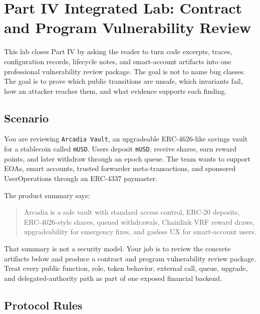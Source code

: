 \chapter*{Part IV Integrated Lab: Contract and Program Vulnerability Review}
{}

\begin{labbox}
This lab closes Part IV by asking the reader to turn code excerpts, traces, configuration records, lifecycle notes, and smart-account artifacts into one professional vulnerability review package. The goal is not to name bug classes. The goal is to prove which public transitions are unsafe, which invariants fail, how an attacker reaches them, and what evidence supports each finding.
\end{labbox}

\section*{Scenario}

You are reviewing \texttt{Arcadia Vault}, an upgradeable ERC-4626-like savings vault for a stablecoin called \texttt{mUSD}. Users deposit \texttt{mUSD}, receive shares, earn reward points, and later withdraw through an epoch queue. The team wants to support EOAs, smart accounts, trusted forwarder meta-transactions, and sponsored UserOperations through an ERC-4337 paymaster.

The product summary says:

\begin{quote}
Arcadia is a safe vault with standard access control, ERC-20 deposits, ERC-4626-style shares, queued withdrawals, Chainlink VRF reward draws, upgradeability for emergency fixes, and gasless UX for smart-account users.
\end{quote}

That summary is not a security model. Your job is to review the concrete artifacts below and produce a contract and program vulnerability review package. Treat every public function, role, token behavior, external call, queue, upgrade, and delegated-authority path as part of one exposed financial backend.

\section*{Protocol Rules}

